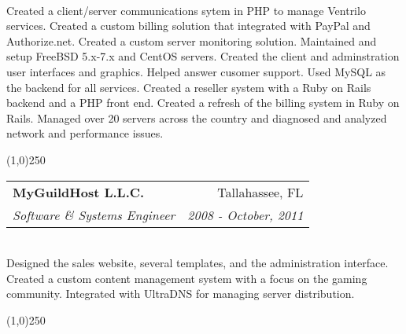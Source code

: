 \documentclass[letterpaper,11pt]{article}
\makeatletter
\newcommand{\ressubheading}[4]{
\begin{tabular*}{7.0in}{l@{\extracolsep{\fill}}r}
		\textbf{#1} & #2 \\
		\textit{#3} & \textit{#4} \\
\end{tabular*}\vspace{-6pt}}
\makeatother
\begin{document}
\hspace{5pt} \\

Created a client/server communications sytem in PHP to manage Ventrilo services.
Created a custom billing solution that integrated with PayPal and Authorize.net.
Created a custom server monitoring solution.
Maintained and setup FreeBSD 5.x-7.x and CentOS servers.
Created the client and adminstration user interfaces and graphics.
Helped answer cusomer support.
Used MySQL as the backend for all services.
Created a reseller system with a Ruby on Rails backend and a PHP front end.
Created a refresh of the billing system in Ruby on Rails.
Managed over 20 servers across the country and diagnosed and analyzed network and performance issues.

\begin{center}
  \line(1,0){250}
\end{center}


\ressubheading{MyGuildHost L.L.C.}{Tallahassee, FL}{Software \& Systems Engineer}{2008 - October, 2011}

\hspace{5pt} \\

Designed the sales website, several templates, and the administration interface.
Created a custom content management system with a focus on the gaming community.
Integrated with UltraDNS for managing server distribution.

\begin{center}
  \line(1,0){250}
\end{center}
\end{document}
